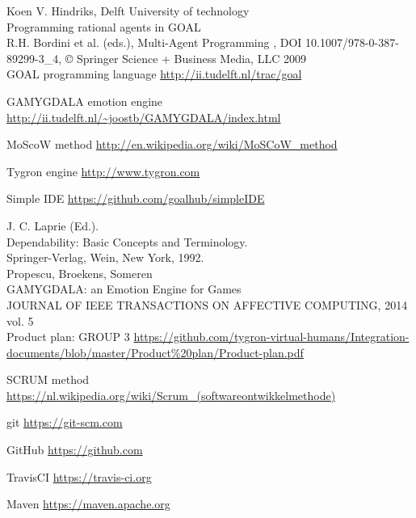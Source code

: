 \documentclass[11pt]{article}
\begin{document}
\clearpage

\printglossaries

\clearpage

\begin{thebibliography}{9}
	Koen V. Hindriks, Delft University of technology\\
	Programming rational agents in GOAL\\
	R.H. Bordini et al. (eds.), Multi-Agent Programming , DOI 10.1007/978-0-387-89299-3_4, © Springer Science + Business Media, LLC 2009 \\

	GOAL programming language
	\url{http://ii.tudelft.nl/trac/goal}
	
	GAMYGDALA emotion engine
	\url{http://ii.tudelft.nl/~joostb/GAMYGDALA/index.html}
	
	MoScoW method
	\url{http://en.wikipedia.org/wiki/MoSCoW_method }
	
	Tygron engine
	\url{http://www.tygron.com }
	
	Simple IDE
	\url{https://github.com/goalhub/simpleIDE }
	
	J. C. Laprie (Ed.).\\ 
	Dependability: Basic Concepts and Terminology. \\
	Springer-Verlag, Wein, New York, 1992.\\

	Propescu, Broekens, Someren\\
	GAMYGDALA: an Emotion Engine for Games\\
	JOURNAL OF IEEE TRANSACTIONS ON AFFECTIVE COMPUTING, 2014 vol. 5\\

	Product plan: GROUP 3
	\url{https://github.com/tygron-virtual-humans/Integration-documents/blob/master/Product\%20plan/Product-plan.pdf}
	
	SCRUM method
	\url{https://nl.wikipedia.org/wiki/Scrum_(softwareontwikkelmethode)}
	
	git
	\url{https://git-scm.com }
	
	GitHub
	\url{https://github.com }
	
	TravisCI
	\url{https://travis-ci.org }
	
	Maven
	\url{https://maven.apache.org }
	
	
\end{thebibliography}
\end{document}
